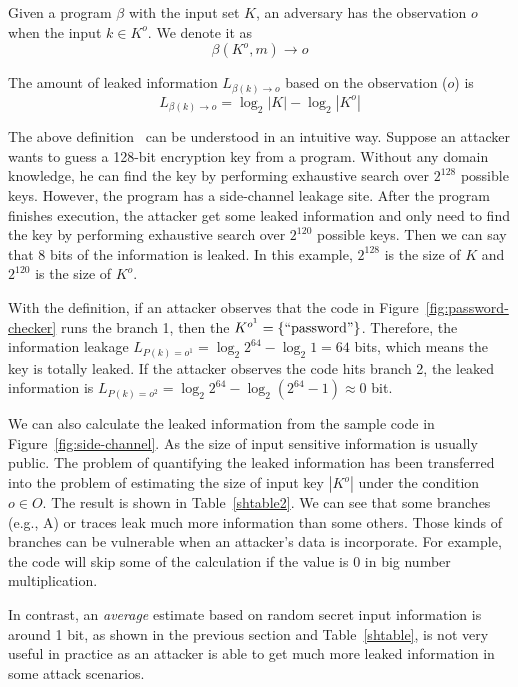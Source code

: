 \begin{mydef}
    \label{chapter4:def}
    Given a program $\beta$ with the input set $K$,
    an adversary has the observation $o$ when the input $k{\in}K^o$.
    We denote it as
    $$\beta(K^o, m) \rightarrow	o$$

    The amount of leaked information $L_{\beta(k)\rightarrow o}$ based on the observation ($o$) is
    $$L_{\beta(k)\rightarrow o} = \log_2{|K|} - \log_2{|K^o|}$$
\end{mydef}

The above definition~\cite{AskarovC12} can be understood in an intuitive way. Suppose an attacker
wants to guess a 128-bit encryption key from a program.
Without any domain knowledge,
he can find the key by performing exhaustive search over $2^{128}$ possible keys.
However, the program has a side-channel leakage site. After the program finishes execution, the
attacker get some leaked information and only need to find the key by performing
exhaustive search over $2^{120}$ possible keys. Then we can say that 8 bits of the information
is leaked. In this example, $2^{128}$ is the size of $K$ and $2^{120}$ is the size of $K^o$.


With the definition, if an attacker observes that the code in
Figure~\ref{fig:password-checker} runs the branch 1, then the $K^{o^{1}} =
    \{\mathrm{``password"}\}$. Therefore, the information leakage $L_{P(k)=o^{1}} =
    \log_2{2^{64}} - \log_2{1} = 64$ bits, which means the key is totally leaked. If
the attacker observes the code hits branch 2, the leaked information is
$L_{P(k)=o^{2}} = \log_2{2^{64}} - \log_2{(2^{64}-1)} \approx 0$ bit.


We can also calculate the leaked information from the sample code in
Figure~\ref{fig:side-channel}. As the size of input sensitive information is
usually public. The problem of quantifying the leaked information has been
transferred into the problem of estimating the size of input key $|K^o|$ under
the condition $o \in O$. The result is shown in Table~\ref{shtable2}. We can see
that some branches (e.g., A) or traces leak much more information than some others.
Those kinds of branches can be vulnerable when an attacker's data is incorporate.
For example, the code will skip some of the calculation if the value is 0 in big
number multiplication.

In contrast, an \emph{average} estimate based on random secret input information is around 1 bit, as shown in the previous section and Table~\ref{shtable}, is not very useful in practice as an attacker is able to get much more leaked
information in some attack scenarios.

